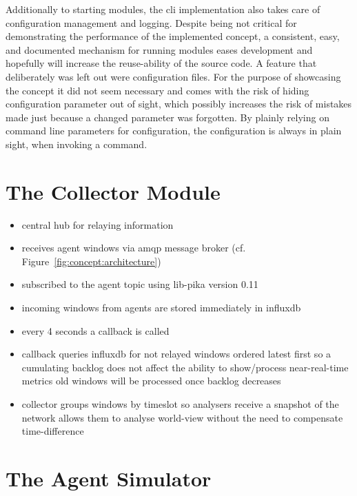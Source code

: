 Additionally to starting modules, the \gls{cli} implementation also takes care of configuration management and logging.
Despite being not critical for demonstrating the performance of the implemented concept, a consistent, easy, and documented mechanism for running modules eases development and hopefully will increase the reuse-ability of the source code.
A feature that deliberately was left out were configuration files. For the purpose of showcasing the concept it did not seem necessary and comes with the risk of hiding configuration parameter out of sight, which possibly increases the risk of mistakes made just because a changed parameter was forgotten. By plainly relying on command line parameters for configuration, the configuration is always in plain sight, when invoking a command.

\section{The Collector Module}
\label{sec:impl:collector}

\begin{itemize}
	\item central hub for relaying information
	\item receives agent windows via \gls{amqp} message broker (cf. Figure~\ref{fig:concept:architecture})
	\item subscribed to the agent topic using \gls{lib-pika} version 0.11
	\item incoming windows from agents are stored immediately in \gls{influxdb}
	\item every 4 seconds a callback  is called
	\item callback queries \gls{influxdb} for not relayed windows
		\subitem ordered latest first
		\subitem so a cumulating backlog does not affect the ability to show/process near-real-time metrics
		\subitem old windows will be processed once backlog decreases
	\item collector groups windows by timeslot
		\subitem so analysers receive a snapshot of the network
		\subitem allows them to analyse world-view without the need to compensate time-difference
\end{itemize}



\section{The Agent Simulator}
\label{sec:impl:agent}

